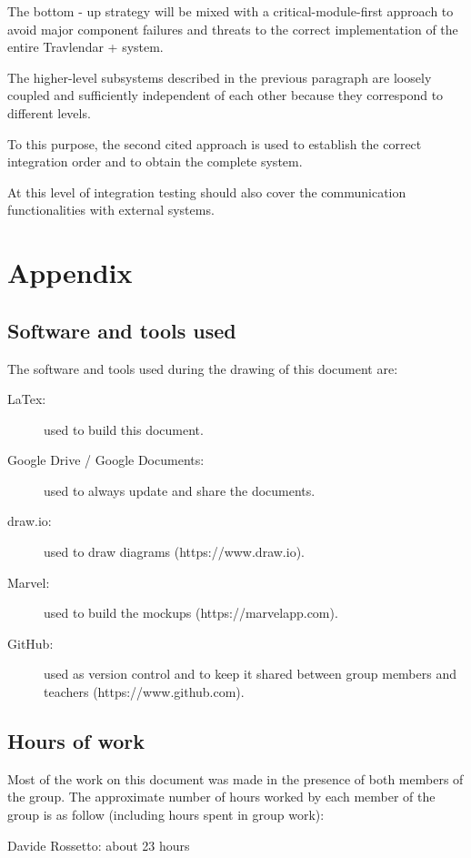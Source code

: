 \documentclass{article}
\begin{document}
	The bottom - up strategy will be mixed with a critical-module-first approach to avoid major component failures and threats to the correct implementation of the entire Travlendar + system.
	
	The higher-level subsystems described in the previous paragraph are loosely coupled and sufficiently independent of each other because they correspond to different levels.
	
	To this purpose, the second cited approach is used to establish the correct integration order and to obtain the complete system.
	
	At this level of integration testing should also cover the communication functionalities with external systems.


	\newpage
	\appendix
	\section{Appendix}


	\subsection{Software and tools used}

	The software and tools used during the drawing of this document are:

	\begin{description}
	\item [LaTex:] used to build this document.
	\item [Google Drive / Google Documents:] used to always update and share the documents.
	\item [draw.io:] used to draw diagrams (https://www.draw.io).
	\item [Marvel:] used to build the mockups (https://marvelapp.com).
	\item [GitHub:] used as version control and to keep it shared between group members and teachers (https://www.github.com).
	\end{description}
	

	\subsection{Hours of work}

	Most of the work on this document was made in the presence of both members of the group. The approximate number of hours worked by each member of the group is as follow (including hours spent in group work):
	
	\bigskip
	Davide Rossetto: about 23 hours
	
\end{document}
